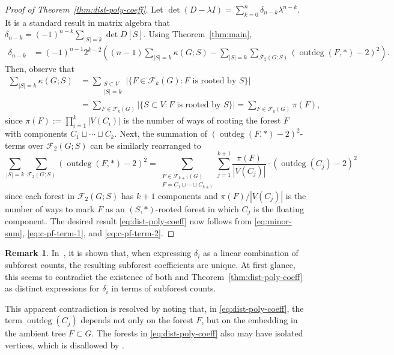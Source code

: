 \documentclass[12pt]{amsart}
\theoremstyle{definition}
\newtheorem{rmk}[thm]{Remark}
\newcommand{\forests}{\mathcal{F}}
\DeclareMathOperator{\outdeg}{outdeg}
\begin{document}
\begin{proof}[Proof of Theorem~\ref{thm:dist-poly-coeff}]
Let $\det(D - \lambda I) = \sum_{k = 0}^n \delta_{n - k} \lambda^{n - k}$.
It is a standard result in matrix algebra that
$\displaystyle \delta_{n - k} = (-1)^{n - k} \sum_{|S| = k} \det D[S]$.
Using Theorem~\ref{thm:main},
\begin{align}\label{eq:minor-sum}
	\delta_{n - k} 
	&= (-1)^{n - 1} 2^{k - 2} \left( (n - 1)\sum_{|S| = k} \kappa(G; S) - \sum_{|S| = k} \sum_{\forests_2(G; S)} (\outdeg(F, *) - 2)^2 \right) .
\end{align}
Then, observe that
\begin{align}
	\sum_{|S| = k} \kappa(G; S) &= \sum_{\substack{S \subset V \\ |S| = k}} |\{F \in \forests_k(G) : \text{$F$ is rooted by $S$}\}| \label{eq:c-pf-term-1}\\
	&= \sum_{F \in \forests_k(G)} |\{S \subset V : \text{$F$ is rooted by $S$}\}|
	= \sum_{F \in \forests_k(G)} \pi(F), \nonumber
\end{align}
since $\pi(F) := \prod_{i = 1}^k |V(C_i)|$ is the number of ways of rooting the forest $F$ with components $C_1 \sqcup \cdots \sqcup C_k$.
Next, the summation of $ (\outdeg(F, *) - 2)^2$-terms over $\forests_2(G; S)$ can be similarly rearranged to
\begin{equation}\label{eq:c-pf-term-2}
	\sum_{|S| = k} \sum_{\forests_2(G; S)} (\outdeg(F, *) - 2)^2 = 
	\sum_{\substack{F \in \forests_{k + 1}(G) \\ F = C_1 \sqcup \cdots \sqcup C_{k + 1}}} \sum_{j = 1}^{k + 1} \frac{\pi(F)}{|V(C_j)|} \cdot  (\outdeg(C_j) - 2)^2
\end{equation}
since each forest in $\forests_2(G; S)$ has $k + 1$ components and $\pi(F) / {|V(C_j)|} $ is the number of ways to mark $F$ as an $(S, *)$-rooted forest in which $C_j$ is the floating component.
The desired result \eqref{eq:dist-poly-coeff} now follows from \eqref{eq:minor-sum}, \eqref{eq:c-pf-term-1}, and \eqref{eq:c-pf-term-2}.
\end{proof}

\begin{rmk}
In~\cite{graham-szemeredi}, it is shown that, when expressing $\delta_i$ as a linear combination of subforest counts, the resulting subforest coefficients are unique.
At first glance, this seems to contradict the existence of both \cite{graham-lovasz} and Theorem~\ref{thm:dist-poly-coeff} as distinct expressions for $\delta_i$ in terms of subforest counts.

This apparent contradiction is resolved by noting that, in \eqref{eq:dist-poly-coeff}, the term $\outdeg(C_j)$ depends not only on the forest $F$, but on the embedding in the ambient tree $F \subset G$.
The forests in \eqref{eq:dist-poly-coeff} also may have isolated vertices, which is disallowed by \cite{graham-szemeredi}.

\end{rmk}
\end{document}
